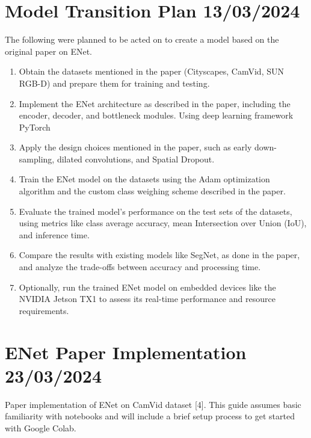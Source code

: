 \section{Model Transition Plan 13/03/2024}
The following were planned to be acted on to create a model based on the original paper on ENet.
\begin{enumerate}
    \item Obtain the datasets mentioned in the paper (Cityscapes, CamVid, SUN RGB-D) and prepare them for training and testing.
    \item Implement the ENet architecture as described in the paper, including the encoder, decoder, and bottleneck modules. Using deep learning framework PyTorch
    \item Apply the design choices mentioned in the paper, such as early down-sampling, dilated convolutions, and Spatial Dropout.
    \item Train the ENet model on the datasets using the Adam optimization algorithm and the custom class weighing scheme described in the paper.
    \item Evaluate the trained model's performance on the test sets of the datasets, using metrics like class average accuracy, mean Intersection over Union (IoU), and inference time.
    \item Compare the results with existing models like SegNet, as done in the paper, and analyze the trade-offs between accuracy and processing time.
    \item Optionally, run the trained ENet model on embedded devices like the NVIDIA Jetson TX1 to assess its real-time performance and resource requirements.
\end{enumerate}

\section{ENet Paper Implementation 23/03/2024}
Paper implementation of ENet on CamVid dataset [4]. This guide assumes basic familiarity with notebooks and will include a brief setup process to get started with Google Colab.
